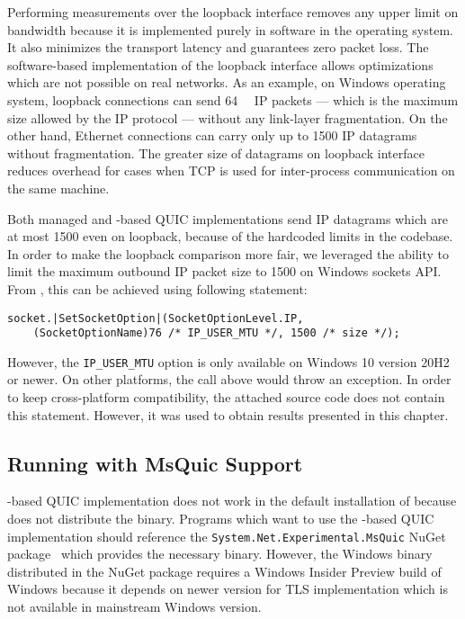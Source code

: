 Performing measurements over the loopback interface removes any upper limit on bandwidth because it
is implemented purely in software in the operating system. It also minimizes the transport latency
and guarantees zero packet loss. The software-based implementation of the loopback interface allows
optimizations which are not possible on real networks. As an example, on Windows operating system,
loopback connections can send \SI{64}{\kibi\byte} IP packets --- which is the maximum size allowed by
the IP protocol --- without any link-layer fragmentation. On the other hand, Ethernet connections can
carry only up to \SI{1500}{\byte} IP datagrams without fragmentation. The greater size of datagrams
on loopback interface reduces overhead for cases when TCP is used for inter-process communication on
the same machine.

Both managed and \libmsquic{}-based QUIC implementations send IP datagrams which are at most
\SI{1500}{\byte} even on loopback, because of the hardcoded limits in the codebase. In order to make
the loopback comparison more fair, we leveraged the ability to limit the maximum outbound IP packet
size to \SI{1500}{\byte} on Windows sockets API\@. From \csharp{}, this can be achieved using
following statement:

\begin{lstlisting}[numbers=none,enums={SocketOptionLevel,SocketOptionName}]
socket.|SetSocketOption|(SocketOptionLevel.IP,
    (SocketOptionName)76 /* IP_USER_MTU */, 1500 /* size */);
\end{lstlisting}

However, the \texttt{IP_USER_MTU} option is only available on Windows 10 version 20H2 or newer. On
other platforms, the  call above would throw an exception. In order to keep
cross-platform compatibility, the attached source code does not contain this statement. However, it
was used to obtain results presented in this chapter.

\subsection{Running with MsQuic Support}

\libmsquic{}-based QUIC implementation does not work in the default installation of \dotnet{}
because \dotnet{} does not distribute the \libmsquic{} binary. Programs which want to use the
\libmsquic{}-based QUIC implementation should reference the
\texttt{System.Net\allowbreak{}.Experimental.MsQuic} NuGet
package~\cite{SystemNetQuicExperimentalMsquic} which provides the necessary \libmsquic{} binary.
However, the Windows \libmsquic{} binary distributed in the NuGet package requires a Windows Insider
Preview build of Windows because it depends on newer \libschannel{} version for TLS implementation
which is not available in mainstream Windows version.

